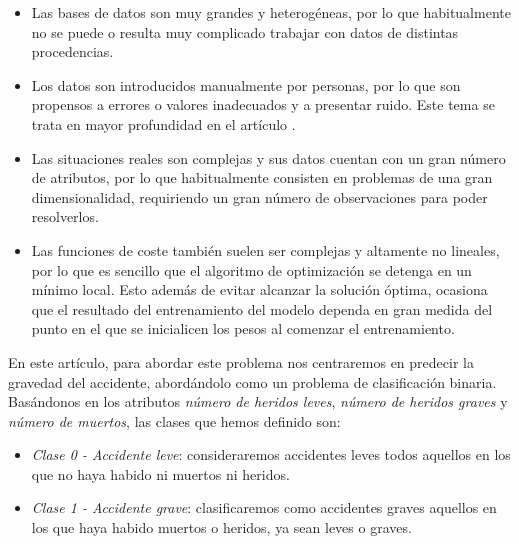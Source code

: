 \documentclass[journal,twoside]{JoPhA}
\begin{document}
\begin{itemize}
	\item Las bases de datos son muy grandes y heterogéneas, por lo que habitualmente no se puede o resulta muy complicado trabajar con datos de distintas procedencias. \\
		
	\item Los datos son introducidos manualmente por personas, por lo que son propensos a errores o valores inadecuados y a presentar ruido. Este tema se trata en mayor profundidad en el artículo  \cite{analisis_datos}. \\
		
	\item Las situaciones reales son complejas y sus datos cuentan con un gran número de atributos, por lo que habitualmente consisten en problemas de una gran dimensionalidad, requiriendo un gran número de observaciones para poder resolverlos. \\
		
	\item Las funciones de coste también suelen ser complejas y altamente no lineales, por lo que es sencillo que el algoritmo de optimización se detenga en un mínimo local. Esto además de evitar alcanzar la solución óptima, ocasiona que el resultado del entrenamiento del modelo dependa en gran medida del punto en el que se inicialicen los pesos al comenzar el entrenamiento. \\
\end{itemize}
	
	
En este artículo, para abordar este problema nos centraremos en predecir la gravedad del accidente, abordándolo como un problema de clasificación binaria. Basándonos en los atributos \emph{número de heridos leves}, \emph{número de heridos graves} y \emph{número de muertos}, las clases que hemos definido son: \\
	
\begin{itemize}
	\item \textit{Clase 0 - Accidente leve}: consideraremos accidentes leves todos aquellos en los que no haya habido ni muertos ni heridos. \\
	\item \textit{Clase 1 - Accidente grave}: clasificaremos como accidentes graves aquellos en los que haya habido muertos o heridos, ya sean leves o graves. \\
\end{itemize}
	
\end{document}
